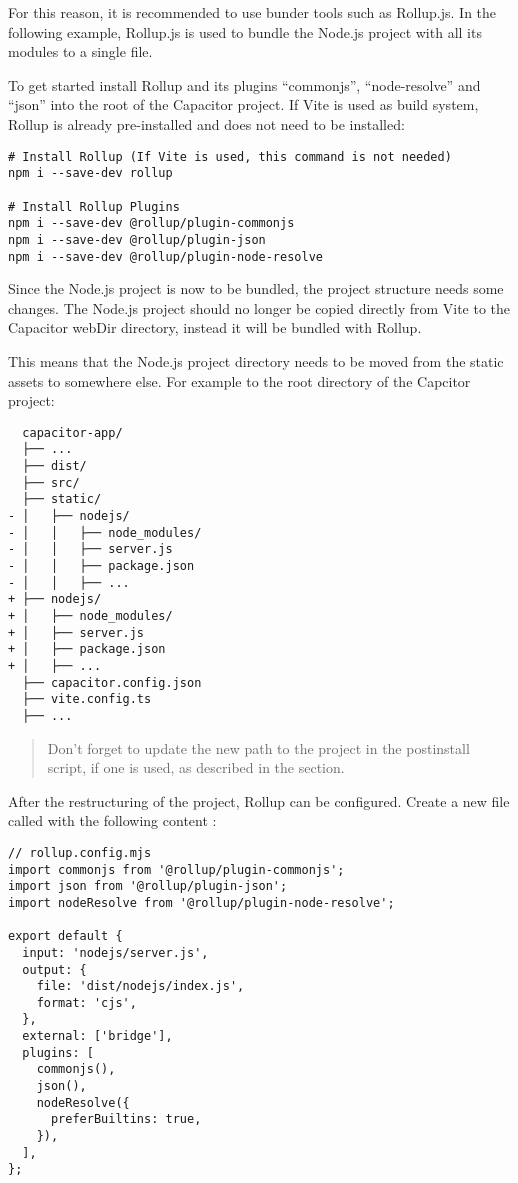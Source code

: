 For this reason, it is recommended to use bunder tools such as Rollup.js.
In the following example, Rollup.js is used to bundle the Node.js project with all its modules to a single file.
\cite{rollup, rollup-plugins}

To get started install Rollup and its plugins \enquote{commonjs}, \enquote{node-resolve} and \enquote{json} into the root of the Capacitor project.
If Vite is used as build system, Rollup is already pre-installed and does not need to be installed:

\begin{verbatim}
# Install Rollup (If Vite is used, this command is not needed)
npm i --save-dev rollup

# Install Rollup Plugins
npm i --save-dev @rollup/plugin-commonjs
npm i --save-dev @rollup/plugin-json
npm i --save-dev @rollup/plugin-node-resolve
\end{verbatim}

Since the Node.js project is now to be bundled, the project structure needs some changes.
The Node.js project should no longer be copied directly from Vite to the Capacitor webDir directory, instead it will be bundled with Rollup.

This means that the Node.js project directory needs to be moved from the static assets to somewhere else.
For example to the root directory of the Capcitor project:

\begin{verbatim}
  capacitor-app/
  ├── ...
  ├── dist/
  ├── src/
  ├── static/
- │   ├── nodejs/
- │   │   ├── node_modules/
- │   │   ├── server.js
- │   │   ├── package.json
- │   │   ├── ...
+ ├── nodejs/
+ │   ├── node_modules/
+ │   ├── server.js
+ │   ├── package.json
+ │   ├── ...
  ├── capacitor.config.json
  ├── vite.config.ts
  ├── ... 
\end{verbatim}

\begin{quote}
  Don't forget to update the new path to the project in the postinstall script,
  if one is used, as described in the  section.
\end{quote}

\newpage

After the restructuring of the project, Rollup can be configured.
Create a new file called  with the following content \cite{rollup, rollup-plugins}:

\begin{verbatim}
// rollup.config.mjs
import commonjs from '@rollup/plugin-commonjs';
import json from '@rollup/plugin-json';
import nodeResolve from '@rollup/plugin-node-resolve';

export default {
  input: 'nodejs/server.js',
  output: {
    file: 'dist/nodejs/index.js',
    format: 'cjs',
  },
  external: ['bridge'],
  plugins: [
    commonjs(),
    json(),
    nodeResolve({
      preferBuiltins: true,
    }),
  ],
}; 
\end{verbatim}


